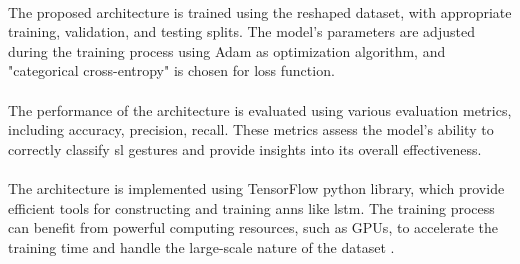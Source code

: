 \paragraph{}
The proposed architecture is trained using the reshaped dataset, with appropriate training, validation, and testing splits. The model's parameters are adjusted during the training process using Adam as optimization algorithm, and "categorical cross-entropy" is chosen for loss function.
\paragraph{}
The performance of the architecture is evaluated using various evaluation metrics, including accuracy, precision, recall. These metrics assess the model's ability to correctly classify \ac{sl} gestures and provide insights into its overall effectiveness.
\paragraph{}
The architecture is implemented using TensorFlow python library, which provide efficient tools for constructing and training \ac{ann}s like \ac{lstm}. The training process can benefit from powerful computing resources, such as GPUs, to accelerate the training time and handle the large-scale nature of the dataset .
